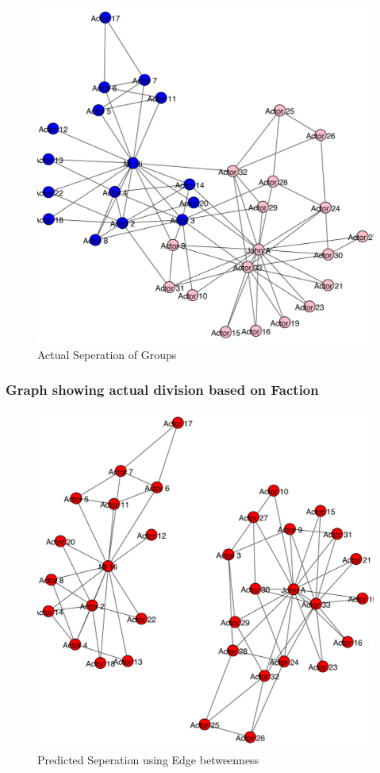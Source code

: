 \documentclass[12pt]{article}
\begin{document}
\begin{figure}[ht]
\includegraphics[scale=0.7]{../qn1/graphkk.pdf}
\centering
\caption{Actual Seperation of Groups}
\label{fig:Actual Seperation of Groups}
\end{figure}
\newpage
\subsubsection{Graph showing actual division based on Faction}
\begin{figure}[ht]
\includegraphics[scale=0.7]{../qn1/finalgraph.pdf}
\centering
\caption{Predicted Seperation using Edge betweenness}
\label{fig:Predicted Seperation using Edge betweenness}
\end{figure}
\newpage
\end{document}
